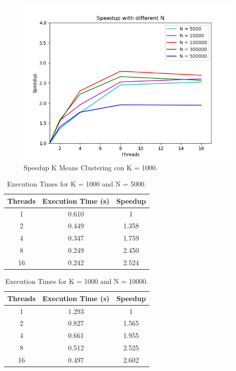 \documentclass[10pt,twocolumn,letterpaper]{article}
\begin{document}
\begin{figure}[H]
	\includegraphics[width=\linewidth]{images/speedup_by_n.png}
	\caption{Speedup K Means Clustering con K = 1000.}
	\label{fig:speedup_n}
\end{figure}

\begin{table}[H]
	\begin{center}
		\begin{tabular}{|c|c|c|}
			\hline
			Threads & Execution Time (s) & Speedup \\
			\hline
			1 & 0.610 & 1 \\ 
			2 & 0.449 & 1.358 \\
			4 & 0.347 & 1.759 \\
			8 & 0.249 & 2.450 \\ 
			16 & 0.242 & 2.524 \\
			\hline
		\end{tabular}
	\end{center}
	\caption{Execution Times for K = 1000 and N = 5000.}
	\label{tab:speedup_k_n_5}
\end{table}

\begin{table}[H]
	\begin{center}
		\begin{tabular}{|c|c|c|}
			\hline
			Threads & Execution Time (s) & Speedup \\
			\hline
			1 & 1.293 & 1 \\ 
			2 & 0.827 & 1.565 \\
			4 & 0.661 & 1.955 \\
			8 & 0.512 & 2.525 \\ 
			16 & 0.497 & 2.602 \\
			\hline
		\end{tabular}
	\end{center}
	\caption{Execution Times for K = 1000 and N = 10000.}
	\label{tab:speedup_k_n_6}
\end{table}
\end{document}
